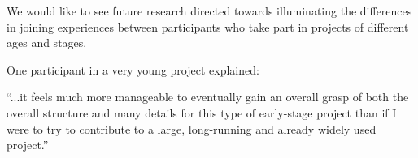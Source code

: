 We would like to see future research directed towards illuminating the differences in joining experiences between participants who take part in projects of different ages and stages. 

One participant in a very young project explained: 

“...it feels much more manageable to eventually gain an overall grasp of both the overall structure and many details for this type of early-stage project than if I were to try to contribute to a large, long-running and already widely used project.”